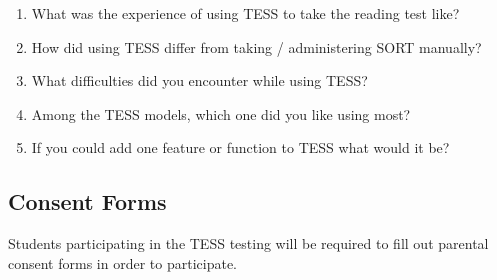 \begin{enumerate}
\item What was the experience of using TESS to take the reading test like?
\item How did using TESS differ from taking / administering SORT manually?
\item What difficulties did you encounter while using TESS?
\item Among the TESS models, which one did you like using most?
\item If you could add one feature or function to TESS what would it be?
\end{enumerate}

\subsection{Consent Forms}
Students participating in the TESS testing will be required to fill out parental consent forms in order to participate. 
